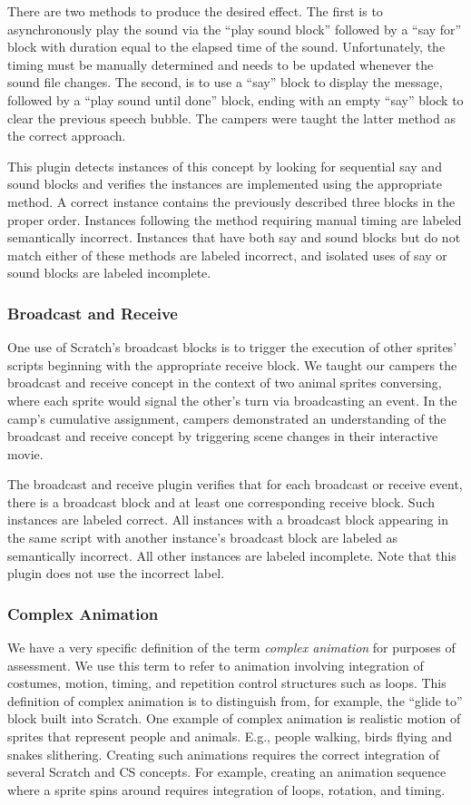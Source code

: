 There are two methods to produce the desired effect.  The first is to
asynchronously play the sound via the ``play sound block'' followed by a ``say
for'' block with duration equal to the elapsed time of the sound.
Unfortunately, the timing must be manually determined and needs to be updated
whenever the sound file changes.  The second, is to use a ``say'' block to
display the message, followed by a ``play sound until done'' block, ending with
an empty ``say'' block to clear the previous speech bubble. The campers were
taught the latter method as the correct approach.

This plugin detects instances of this concept by looking for sequential say and
sound blocks and verifies the instances are implemented using the appropriate
method.  A correct instance contains the previously described three blocks in
the proper order.  Instances following the method requiring manual timing are
labeled semantically incorrect. Instances that have both say and sound blocks
but do not match either of these methods are labeled incorrect, and isolated
uses of say or sound blocks are labeled incomplete.


\subsubsection*{Broadcast and Receive}
One use of Scratch's broadcast blocks is to trigger the execution of other
sprites' scripts beginning with the appropriate receive block. We taught our
campers the broadcast and receive concept in the context of two animal sprites
conversing, where each sprite would signal the other's turn via broadcasting an
event. In the camp's cumulative assignment, campers demonstrated an
understanding of the broadcast and receive concept by triggering scene changes
in their interactive movie.

The broadcast and receive plugin verifies that for each broadcast or receive
event, there is a broadcast block and at least one corresponding receive
block. Such instances are labeled correct. All instances with a broadcast block
appearing in the same script with another instance's broadcast block are
labeled as semantically incorrect. All other instances are labeled
incomplete. Note that this plugin does not use the incorrect label.

\subsubsection*{Complex Animation}
We have a very specific definition of the term {\em complex animation} for
purposes of assessment.  We use this term to refer to animation involving
integration of costumes, motion, timing, and repetition control structures such
as loops. This definition of complex animation is to distinguish from, for
example, the ``glide to'' block built into Scratch.  One example of complex
animation is realistic motion of sprites that represent people and
animals. E.g., people walking, birds flying and snakes slithering.  Creating
such animations requires the correct integration of several Scratch and CS
concepts.  For example, creating an animation sequence where a sprite spins
around requires integration of loops, rotation, and timing.

